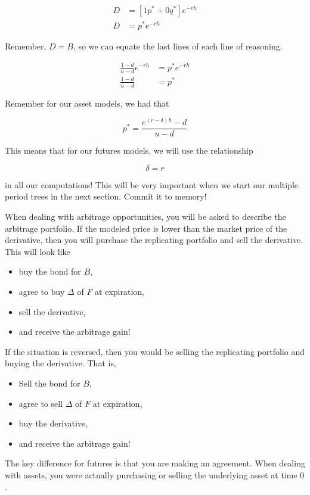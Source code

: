 \documentclass{ximera}
\begin{document}
\begin{align*}
D&=[1p^*+0q^*]e^{-rh}\\
D&=p^*e^{-rh}
\end{align*}

Remember, $D=B$, so we can equate the last lines of each line of reasoning.

\begin{align*}
\frac{1-d}{u-d}e^{-rh}&=p^*e^{-rh}\\
\frac{1-d}{u-d}&=p^*
\end{align*}

Remember for our asset models, we had that 

\begin{equation*}
p^*=\frac{e^{(r-\delta)h}-d}{u-d}
\end{equation*}

This means that for our futures models, we will use the relationship

\begin{equation*}
\boxed{\delta=r}
\end{equation*}

in all our computations! This will be very important when we start our multiple period trees in the next section. Commit it to memory!

When dealing with arbitrage opportunities, you will be asked to describe the arbitrage portfolio. If the modeled price is lower than the market price of the derivative, then you will purchase the replicating portfolio and sell the derivative. This will look like

\begin{itemize}
\item buy the bond for $B$,
\item agree to buy $\Delta$ of $F$ at expiration,
\item sell the derivative,
\item and receive the arbitrage gain!
\end{itemize}

If the situation is reversed, then you would be selling the replicating portfolio and buying the derivative. That is,

\begin{itemize}
\item Sell the bond for $B$,
\item agree to sell $\Delta$ of $F$ at expiration,
\item buy the derivative,
\item and receive the arbitrage gain!
\end{itemize}

The key difference for futures is that you are making an agreement. When dealing with assets, you were actually purchasing or selling the underlying asset at time $0$.
\end{document}
